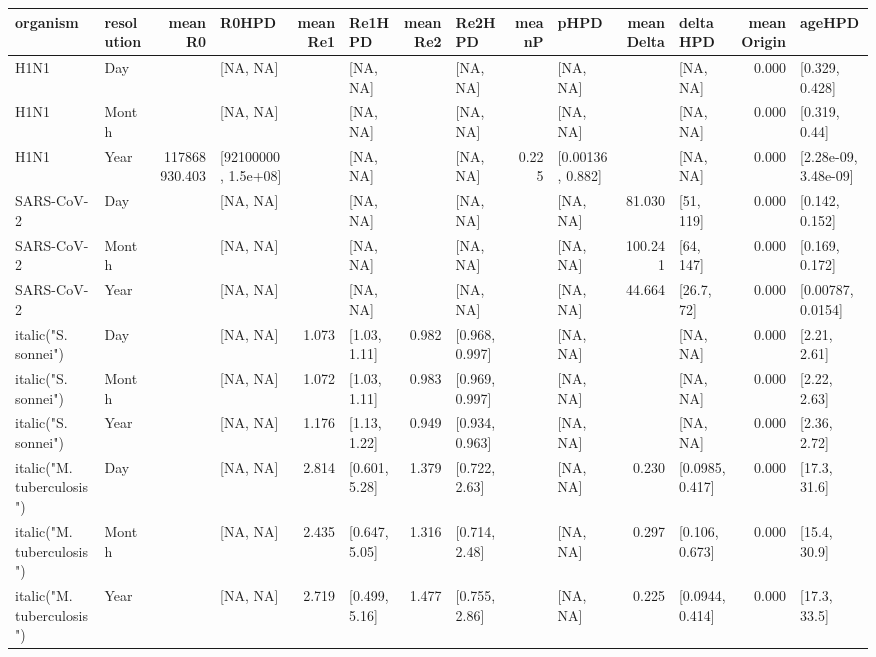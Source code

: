 \begin{table}[ht]
\centering
\begin{tabular}{llrlrlrlrlrlrl}
  \hline
organism & resolution & meanR0 & R0HPD & meanRe1 & Re1HPD & meanRe2 & Re2HPD & meanP & pHPD & meanDelta & deltaHPD & meanOrigin & ageHPD \\ 
  \hline
H1N1 & Day &  & [NA, NA] &  & [NA, NA] &  & [NA, NA] &  & [NA, NA] &  & [NA, NA] & 0.000 & [0.329, 0.428] \\ 
  H1N1 & Month &  & [NA, NA] &  & [NA, NA] &  & [NA, NA] &  & [NA, NA] &  & [NA, NA] & 0.000 & [0.319, 0.44] \\ 
  H1N1 & Year & 117868930.403 & [92100000, 1.5e+08] &  & [NA, NA] &  & [NA, NA] & 0.225 & [0.00136, 0.882] &  & [NA, NA] & 0.000 & [2.28e-09, 3.48e-09] \\ 
  SARS-CoV-2 & Day &  & [NA, NA] &  & [NA, NA] &  & [NA, NA] &  & [NA, NA] & 81.030 & [51, 119] & 0.000 & [0.142, 0.152] \\ 
  SARS-CoV-2 & Month &  & [NA, NA] &  & [NA, NA] &  & [NA, NA] &  & [NA, NA] & 100.241 & [64, 147] & 0.000 & [0.169, 0.172] \\ 
  SARS-CoV-2 & Year &  & [NA, NA] &  & [NA, NA] &  & [NA, NA] &  & [NA, NA] & 44.664 & [26.7, 72] & 0.000 & [0.00787, 0.0154] \\ 
  italic("S. sonnei") & Day &  & [NA, NA] & 1.073 & [1.03, 1.11] & 0.982 & [0.968, 0.997] &  & [NA, NA] &  & [NA, NA] & 0.000 & [2.21, 2.61] \\ 
  italic("S. sonnei") & Month &  & [NA, NA] & 1.072 & [1.03, 1.11] & 0.983 & [0.969, 0.997] &  & [NA, NA] &  & [NA, NA] & 0.000 & [2.22, 2.63] \\ 
  italic("S. sonnei") & Year &  & [NA, NA] & 1.176 & [1.13, 1.22] & 0.949 & [0.934, 0.963] &  & [NA, NA] &  & [NA, NA] & 0.000 & [2.36, 2.72] \\ 
  italic("M. tuberculosis") & Day &  & [NA, NA] & 2.814 & [0.601, 5.28] & 1.379 & [0.722, 2.63] &  & [NA, NA] & 0.230 & [0.0985, 0.417] & 0.000 & [17.3, 31.6] \\ 
  italic("M. tuberculosis") & Month &  & [NA, NA] & 2.435 & [0.647, 5.05] & 1.316 & [0.714, 2.48] &  & [NA, NA] & 0.297 & [0.106, 0.673] & 0.000 & [15.4, 30.9] \\ 
  italic("M. tuberculosis") & Year &  & [NA, NA] & 2.719 & [0.499, 5.16] & 1.477 & [0.755, 2.86] &  & [NA, NA] & 0.225 & [0.0944, 0.414] & 0.000 & [17.3, 33.5] \\ 
   \hline
\end{tabular}
\end{table}
